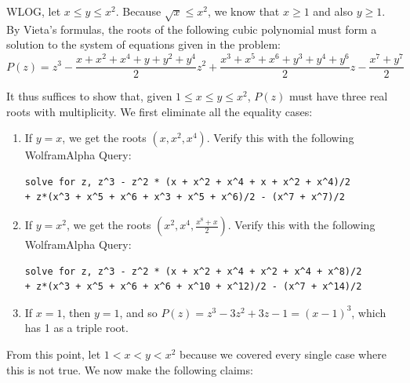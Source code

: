 \documentclass[10pt]{../usamts}
\begin{document}
\begin{solution}{4}
WLOG, let $x \le y \le x^2$. Because $\sqrt{x} \le x^2$, we know that $x \ge 1$ and also $y \ge 1$. By Vieta's formulas, the roots of the following cubic polynomial must form a solution to the system of equations given in the problem:
\[
    P(z) = z^3 - \frac{x + x^2 + x^4 + y + y^2 + y^4}{2}z^2 + \frac{x^3 + x^5 + x^6 + y^3 + y^4 + y^6}{2}z - \frac{x^7 + y^7}{2}
\]

It thus suffices to show that, given $1 \le x \le y \le x^2$, $P(z)$ must have three real roots with multiplicity. We first eliminate all the equality cases:

\begin{enumerate}
\item If $y=x$, we get the roots $(x, x^2, x^4)$. Verify this with the following WolframAlpha Query:
\begin{verbatim}
solve for z, z^3 - z^2 * (x + x^2 + x^4 + x + x^2 + x^4)/2
+ z*(x^3 + x^5 + x^6 + x^3 + x^5 + x^6)/2 - (x^7 + x^7)/2
\end{verbatim}
    
\item If $y=x^2$, we get the roots $(x^2, x^4, \frac{x^8 + x}{2})$. Verify this with the following WolframAlpha Query:
\begin{verbatim}
solve for z, z^3 - z^2 * (x + x^2 + x^4 + x^2 + x^4 + x^8)/2
+ z*(x^3 + x^5 + x^6 + x^6 + x^10 + x^12)/2 - (x^7 + x^14)/2
\end{verbatim}

\item If $x=1$, then $y=1$, and so $P(z) = z^3 - 3z^2 + 3z - 1 = (x-1)^3$, which has 1 as a triple root.
\end{enumerate}

From this point, let $1 < x < y < x^2$ because we covered every single case where this is not true. We now make the following claims:


\end{solution}
\end{document}

